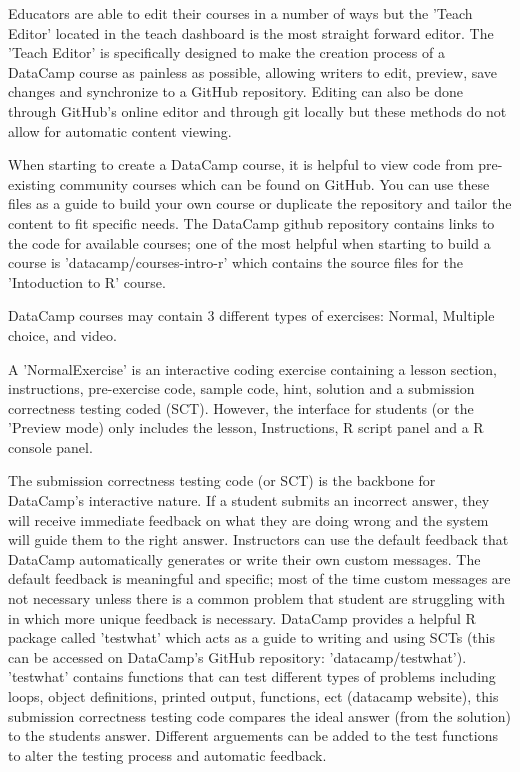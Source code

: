 \documentclass{tise_style}
\begin{document}
Educators are able to edit their courses in a number of ways but the 'Teach Editor' located in the teach dashboard is the
most straight forward editor. The 'Teach Editor' is specifically designed to make the creation process of a DataCamp course
as painless as possible, allowing writers to edit, preview, save changes and synchronize to a GitHub repository. Editing can
also be done through GitHub's online editor and through git locally but these methods do not allow for automatic content
viewing.

When starting to create a DataCamp course, it is helpful to view code from pre-existing community courses which can be found on GitHub.
You can use these files as a guide to build your own course or duplicate the repository and tailor the content to fit specific needs.
The DataCamp github repository contains links to the code for available courses; one of the most helpful when starting to build a course 
is 'datacamp/courses-intro-r' which contains the source files for the 'Intoduction to R' course.


DataCamp courses may contain 3 different types of exercises: Normal, Multiple choice, and video.

A 'NormalExercise' is an interactive coding exercise containing a lesson section, instructions, pre-exercise code, sample
code, hint, solution and a submission correctness testing coded (SCT). However, the interface for students (or the 'Preview
mode) only includes the lesson, Instructions, R script panel and a R console panel.


The submission correctness testing code (or SCT) is the backbone for DataCamp's interactive nature. If a student submits an incorrect answer, they will 
receive immediate feedback on what they are doing wrong and the system will guide them to the right answer. Instructors can use the default feedback
that DataCamp automatically generates or write their own custom messages. The default feedback is meaningful and specific; most of the time custom 
messages are not necessary unless there is a common problem that student are struggling with in which more unique feedback is necessary. 
DataCamp provides a helpful R package called 'testwhat' which acts as a guide to writing and using SCTs (this can be accessed on DataCamp's GitHub 
repository: 'datacamp/testwhat'). 
'testwhat' contains functions that can test different types of problems including loops, object definitions, printed output, functions, ect 
(datacamp website), this submission correctness testing code compares the ideal answer (from the solution) to the students answer. Different
arguements can be added to the test functions to alter the testing process and automatic feedback.
\end{document}
